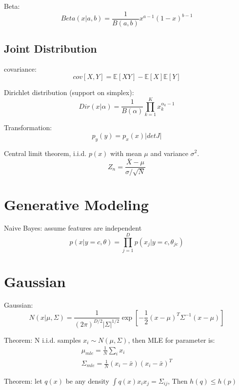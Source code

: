 \documentclass{article}
\begin{document}
Beta:
\begin{equation*}
Beta(x|a,b)=\frac{1}{B(a,b)}x^{a-1}(1-x)^{b-1}
\end{equation*}

\subsection{Joint Distribution}
covariance:
\begin{equation*}
cov[X, Y]=\mathbb{E}[XY]-\mathbb{E}[X]\mathbb{E}[Y]
\end{equation*}

Dirichlet distribution (support on simplex):
\begin{equation*}
Dir(x|\alpha)=\frac{1}{B(\alpha)}\prod_{k=1}^K x_k^{\alpha_k-1}
\end{equation*}

Transformation:
\begin{equation*}
p_y(y)=p_x(x)|det J|
\end{equation*}

Central limit theorem, i.i.d. $p(x)$ with mean $\mu$ and variance $\sigma^2$.
\begin{equation*}
Z_n=\frac{\bar{X}-\mu}{\sigma/\sqrt{N}}
\end{equation*}

\section{Generative Modeling}
Naive Bayes: assume features are independent
\begin{equation*}
p(x|y=c,\theta)=\prod_{j=1}^D p(x_j|y=c,\theta_{jc})
\end{equation*}

\section{Gaussian}
Gaussian:
\begin{equation}
N(x|\mu,\Sigma)=\frac{1}{(2\pi)^{D/2}|\Sigma|^{1/2}}\exp[-\frac{1}{2}(x-\mu)^T\Sigma^{-1}(x-\mu)]
\end{equation}

Theorem: N i.i.d. samples $x_i\sim N(\mu,\Sigma)$, then MLE for parameter is:
\begin{eqnarray}
\mu_{mle}=\frac{1}{N}\sum_ix_i\\
\Sigma_{mle}=\frac{1}{N}(x_i-\bar{x})(x_i-\bar{x})^T
\end{eqnarray}

Theorem: let $q(x)$ be any density $\int q(x)x_ix_j=\Sigma_{ij}$, Then $h(q)\le h(p)$
\end{document}
